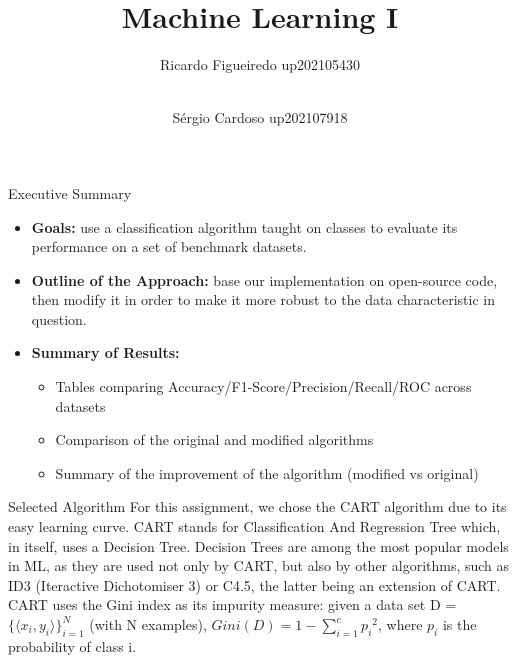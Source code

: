 \documentclass{beamer}
\title{Machine Learning I}
\author[Ricardo Figueiredo, Sérgio Cardoso]{
    Ricardo Figueiredo up202105430 
    \and  \\
    Sérgio Cardoso up202107918
}
\begin{document}
\maketitle

\begin{frame}{Executive Summary}
    \begin{itemize}
        \item \textbf{Goals:} use a classification algorithm taught on classes 
        to evaluate its performance on a set of benchmark datasets.
        \pause
        \item \textbf{Outline of the Approach:} base our implementation on 
        open-source code, then modify it 
        in order to make it more robust to the data 
        characteristic in question.
        \pause
        \item \textbf{Summary of Results:} 
        \begin{itemize}
            \item Tables comparing Accuracy/F1-Score/Precision/Recall/ROC across datasets
            \item Comparison of the original and modified algorithms
            \item Summary of the improvement of the algorithm
            (modified vs original)
        \end{itemize}
    \end{itemize}
\end{frame}

\begin{frame}{Selected Algorithm} 
    For this assignment, we chose the CART algorithm due to its easy learning curve. 
    CART stands for Classification And Regression Tree which, in 
    itself, uses a Decision Tree. 
    Decision Trees are among the most popular models in ML, as they are used 
    not only by CART, but also by other algorithms, such as ID3 (Iteractive 
    Dichotomiser 3) or C4.5, the latter being an extension of CART. \\  
    CART uses the Gini index as its impurity measure: given a data set D = $\{ \langle x_{i}, 
        y_{i}\rangle \}_{i = 1}^{N}$ (with N examples), $Gini(D) = 1 - \sum_{i = 1}^{c} {p_{i}}^2$, where
        $p_{i}$ is the probability of class i. \\
\end{frame}
\end{document}

